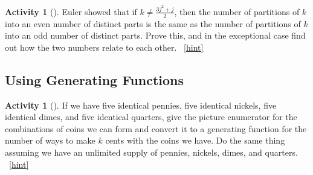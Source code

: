 \documentclass[10pt,]{book}
\theoremstyle{plain}
\theoremstyle{definition}
\theoremstyle{definition}
\theoremstyle{definition}
\newtheorem{activity}[project]{Activity}
\numberwithin{equation}{chapter}
\begin{document}
\begin{activity}[]\label{activity-308}
\hypertarget{p-1558}{}%
Euler showed that if \(k\not= \frac{3j^2+j}{2}\), then the number of partitions of \(k\) into an even number of distinct parts is the same as the number of partitions of \(k\) into an odd number of distinct parts. Prove this, and in the exceptional case find out how the two numbers relate to each other.%
~\hfill{\tiny\hyperlink{a-315}{[hint]}\hypertarget{q-315}{}}\end{activity}
\typeout{************************************************}
\typeout{************************************************}
\subsection[{Using Generating Functions}]{Using Generating Functions}\label{sec_genfns-int-parts}
\begin{activity}[]\label{change-making}
\hypertarget{p-1565}{}%
If we have five identical pennies, five identical nickels, five identical dimes, and five identical quarters, give the picture enumerator for the combinations of coins we can form and convert it to a generating function for the number of ways to make \(k\) cents with the coins we have. Do the same thing assuming we have an unlimited supply of pennies, nickels, dimes, and quarters.%
~\hfill{\tiny\hyperlink{a-316}{[hint]}\hypertarget{q-316}{}}\end{activity}
\end{document}

